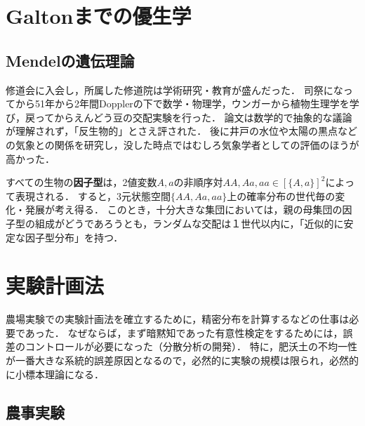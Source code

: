 \documentclass[uplatex,dvipdfmx]{jsreport}
\begin{document}
\section{Galtonまでの優生学}

\subsection{Mendelの遺伝理論}

\begin{history}
    修道会に入会し，所属した修道院は学術研究・教育が盛んだった．
    司祭になってから51年から2年間Dopplerの下で数学・物理学，ウンガーから植物生理学を学び，戻ってからえんどう豆の交配実験を行った．
    論文\cite{Mendel66}は数学的で抽象的な議論が理解されず，「反生物的」とさえ評された．
    後に井戸の水位や太陽の黒点などの気象との関係を研究し，没した時点ではむしろ気象学者としての評価のほうが高かった．
\end{history}

\begin{theory}
    すべての生物の\textbf{因子型}は，2値変数$A,a$の非順序対$AA,Aa,aa\in[\{A,a\}]^2$によって表現される．
    すると，3元状態空間$\{AA,Aa,aa\}$上の確率分布の世代毎の変化・発展が考え得る．
    このとき，十分大きな集団においては，親の母集団の因子型の組成がどうであろうとも，ランダムな交配は１世代以内に，「近似的に安定な因子型分布」を持つ\cite{Hardy08}．
\end{theory}

\begin{theory}[性染色体]
\end{theory}

\section{実験計画法}

\begin{tcolorbox}[colframe=ForestGreen, colback=ForestGreen!10!white,breakable,colbacktitle=ForestGreen!40!white,coltitle=black,fonttitle=\bfseries\sffamily,
title=]
    農場実験での実験計画法を確立するために，精密分布を計算するなどの仕事は必要であった．
    なぜならば，まず暗黙知であった有意性検定をするためには，誤差のコントロールが必要になった（分散分析の開発）．
    特に，肥沃土の不均一性が一番大きな系統的誤差原因となるので，必然的に実験の規模は限られ，必然的に小標本理論になる．
\end{tcolorbox}

\subsection{農事実験}
\end{document}
